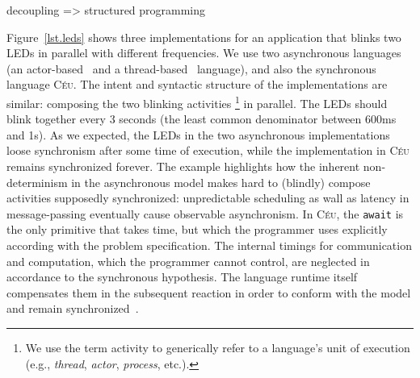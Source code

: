 \documentclass{acm_proc_article-sp}
\newcommand{\CEU}{\textsc{C\'{e}u}\xspace}
\newcommand{\code}[1] {{\small{\texttt{#1}}}}
\newcommand{\1}{\;}
\newcommand{\2}{\;\;}
\newcommand{\3}{\;\;\;}
\newcommand{\5}{\;\;\;\;\;}
\begin{document}
decoupling =>
structured programming

Figure~\ref{lst.leds} shows three implementations for an application that 
blinks two LEDs in parallel with different frequencies.
We use two asynchronous languages (an actor-based~\cite{arduino.occam} and a 
thread-based~\cite{arduino.chibios} language), and also the synchronous 
language \CEU.
%
The intent and syntactic structure of the implementations are similar:
composing the two blinking activities%
\footnote{We use the term activity to generically refer to a language's unit of 
execution (e.g., \emph{thread}, \emph{actor}, \emph{process}, etc.).}
in parallel.
%
The LEDs should blink together every 3 seconds (the least common denominator 
between 600ms and 1s).
%
As we expected, the LEDs in the two asynchronous implementations loose 
synchronism after some time of execution, while the implementation in \CEU 
remains synchronized forever.
%
The example highlights how the inherent non-determinism in the asynchronous 
model makes hard to (blindly) compose activities supposedly synchronized: 
unpredictable scheduling as wall as latency in message-passing eventually cause 
observable asynchronism.
%
In \CEU, the \code{await} is the only primitive that takes time, but which the 
programmer uses explicitly according with the problem specification.
The internal timings for communication and computation, which the programmer 
cannot control, are neglected in accordance to the synchronous hypothesis.
The language runtime itself compensates them in the subsequent reaction in 
order to conform with the model and remain synchronized~\cite{ceu.sensys13}.
\end{document}
